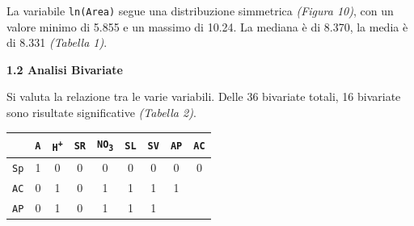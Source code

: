 \documentclass{article} %
\begin{document}
La variabile \texttt{ln(Area)} segue una distribuzione simmetrica \textit{(Figura 10)}, con un valore minimo di 5.855 e un massimo di 10.24. La mediana è di 8.370, la media è di 8.331 \textit{(Tabella 1)}.


\newpage
\begin{flushleft}
    \textbf{\Large 1.2 \: Analisi Bivariate}
    \vskip 10pt
\end{flushleft}
\vskip 10pt

Si valuta la relazione tra le varie variabili. Delle 36 bivariate totali, 16 bivariate sono risultate significative \textit{(Tabella 2)}.\\

\begin{table}[H]
    \centering
    \renewcommand{\arraystretch}{1.4} %
    \begin{tabular}{lcccccccc}
        \toprule
        & \texttt{A} & \texttt{H\textsuperscript{+}} & \texttt{SR} & \texttt{NO\textsubscript{3}} & \texttt{SL} & \texttt{SV} & \texttt{AP} & \texttt{AC} \\
        \midrule  
            \texttt{Sp} & 1 & 0 & 0 & 0 & 0 & 0 & 0 & 0 \\
            \texttt{AC} & 0 & 1 & 0 & 1 & 1 & 1 & 1 \\
            \texttt{AP} & 0 & 1 & 0 & 1 & 1 & 1 &  \\

\end{tabular}
\end{table}
\end{document}
